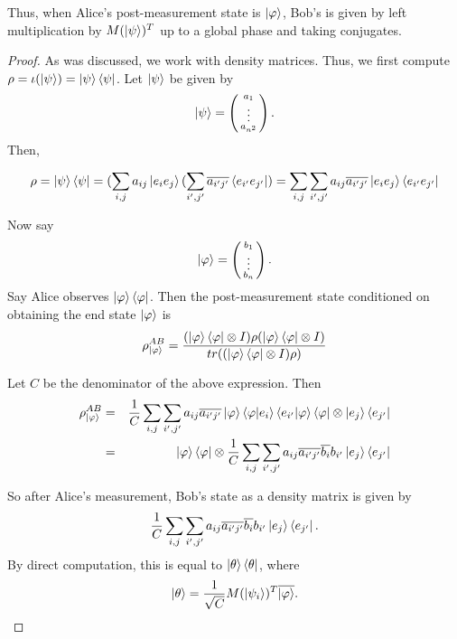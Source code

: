 Thus, when Alice's post-measurement state is $\ket{\varphi}$, Bob's is given by left multiplication by $M(\ket{\psi})^T$ up to a global phase and taking conjugates.

\begin{proof}
As was discussed, we work with density matrices.  Thus, we first compute $\rho=\iota(\ket{\psi})=\ket{\psi}\bra{\psi}$.  Let $\ket{\psi}$ be given by 
\begin{equation}
\ket{\psi}=\left(\begin{smallmatrix}a_1\\ \vdots \\a_{n^2}\end{smallmatrix}\right).
\end{equation}
Then, 

\begin{equation}
\rho=\ket{\psi}\bra{\psi}=(\sum_{i,j} a_{ij}\ket{e_i e_j}(\sum_{i',j'} \overline{a_{i'j'}}\bra{e_{i'} e_{j'}})=\sum_{i,j} \sum_{i',j'} a_{ij} \overline{a_{i'j'}}\ket{e_i e_j}\bra{e_{i'} e_{j'}}   
\end{equation}

Now say
\begin{equation}
\ket{\varphi}=\left(\begin{smallmatrix}b_1\\ \vdots \\b_n\end{smallmatrix}\right).
\end{equation}
Say Alice observes $\ket{\varphi}\bra{\varphi}$.
Then the post-measurement state conditioned on obtaining the end state $\ket{\varphi}$ is
\begin{equation}
\rho_{\ket{\varphi}}^{AB}=\frac{(\ket{\varphi}\bra{\varphi} \otimes I)\rho(\ket{\varphi}\bra{\varphi} \otimes I)}{tr((\ket{\varphi}\bra{\varphi} \otimes I)\rho)}
\end{equation}

Let $C$ be the denominator of the above expression. Then 
\begin{eqnarray}
\rho_{\ket{\varphi}}^{AB}&=&\frac{1}{C} \sum_{i,j} \sum_{{i'}, {j'}} a_{ij} \overline{a_{i'j'}}\ket{\varphi}\braket{\varphi|e_i}\braket{e_{i'}|\varphi}\bra{\varphi} \otimes \ket{e_j}\bra{e_{j'}}\\
&=&\ket{\varphi}\bra{\varphi} \otimes \frac{1}{C} \sum_{i,j} \sum_{{i'}, {j'}} a_{ij} \overline{a_{i'j'}}\overline{b_i}b_{i'}\ket{e_j}\bra{e_{j'}}
\end{eqnarray}

So after Alice's measurement, Bob's state as a density matrix is given by
\begin{equation}
    \frac{1}{C} \sum_{i,j} \sum_{{i'}, {j'}} a_{ij} \overline{a_{i'j'}}\overline{b_i}b_{i'}\ket{e_j}\bra{e_{j'}}.
\end{equation}
By direct computation, this is equal to $\ket{\theta}\bra{\theta}$, where
\begin{equation}
    \ket{\theta}=\frac{1}{\sqrt{C}} M(\ket{\psi_i})^T \overline{\ket{\varphi}}.
\end{equation}


\end{proof}
